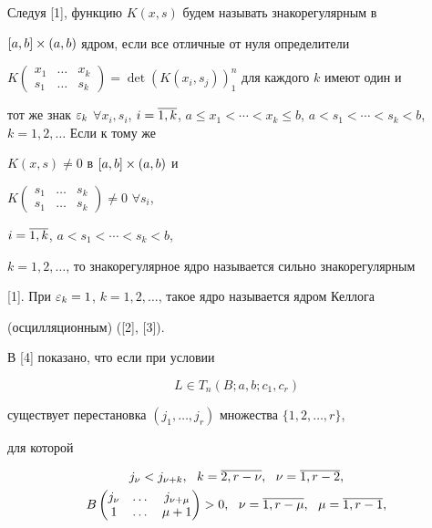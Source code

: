 Следуя [1], функцию $K(x,s)$ будем называть знакорегулярным в


$[a,b]\times(a,b)$ ядром, если все отличные от нуля определители


$K\left(\begin{smallmatrix}


x_1 & \dotsc & x_k \\ s_1 & \dotsc & s_k \end{smallmatrix}\right)


=\det( K(x_i,s_j))^n_1$ для каждого $k$ имеют один и


тот же знак $\eps_k$ \; $\forall x_i,s_i$, $i=\o{1,k}$, $a\le x_1<\dotsb


<x_k\le b$, $a<s_1<\dotsb<s_k<b$, $k=1,2,\dotsc$ Если к тому же


$K(x,s)\ne 0$ в $[a,b]\times(a,b)$ и


$K\left(\begin{smallmatrix} s_1 & \dotsc & s_k \\ s_1 & \dotsc & s_k


\end{smallmatrix}\right)\ne 0$ \; $\forall s_i$,


$i=\overline{1,k}$, $a<s_1<\dotsb<s_k<b$,


$k=1,2,\dotsc$, то знакорегулярное ядро называется сильно знакорегулярным


[1]. При $\varepsilon_k=1$, $k=1,2,\dotsc$, такое ядро называется ядром Келлога


(осцилляционным) ([2], [3]).





В [4] показано, что если при условии


\begin{equation}


L\in T_n(B;a,b;c_1,c_r)


\end{equation}


существует перестановка $(j_1,\dotsc,j_r)$ множества $\{ 1,2,\dotsc,r\}$,


для которой


\begin{gather}


j_\nu<j_{\nu+k},\ \ k=\o{2,r-\nu}, \ \ \nu=\o{1,r-2},\\


%


B\begin{pmatrix}


j_\nu & \dotsc & j_{\nu+\mu}\\ 1 & \dotsc & \mu+1 \end{pmatrix}


>0,\ \ \nu=\o{1,r-\mu},\ \ \mu=\o{1,r-1},


\end{gather}


